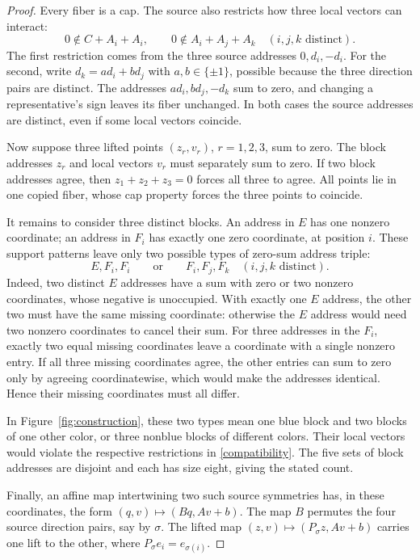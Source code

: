 \documentclass[11pt]{article}
\begin{document}
\begin{proof}
Every fiber is a cap. The source also restricts how three local vectors
can interact:
\begin{equation}\label{compatibility}
 0\notin C+A_i+A_i,\qquad
 0\notin A_i+A_j+A_k\quad(i,j,k\text{ distinct}).
\end{equation}
The first restriction comes from the three source addresses
$0,d_i,-d_i$. For the second, write $d_k=a d_i+b d_j$ with
$a,b\in\{\pm1\}$, possible because the three direction pairs are distinct.
The addresses $a d_i,b d_j,-d_k$ sum to zero, and changing a representative's
sign leaves its fiber unchanged. In both cases the source addresses are
distinct, even if some local vectors coincide.

Now suppose three lifted points $(z_r,v_r)$, $r=1,2,3$, sum to zero.
The block addresses $z_r$ and local vectors $v_r$ must separately sum to zero.
If two block addresses agree, then $z_1+z_2+z_3=0$ forces all three
to agree. All points lie in one copied fiber, whose cap property forces
the three points to coincide.

It remains to consider three distinct blocks. An address in $E$ has
one nonzero coordinate; an address in $F_i$ has exactly one zero
coordinate, at position $i$. These support patterns leave only two
possible types of zero-sum address triple:
\[
 E,F_i,F_i
 \qquad\text{or}\qquad
 F_i,F_j,F_k\quad(i,j,k\text{ distinct}).
\]
Indeed, two distinct $E$ addresses have a sum with zero or two nonzero
coordinates, whose negative is unoccupied. With exactly one $E$ address,
the other two must have the same missing coordinate: otherwise the $E$
address would need two nonzero coordinates to cancel their sum.
For three addresses in the $F_i$, exactly two equal missing coordinates leave a
coordinate with a single nonzero entry. If all three missing coordinates
agree, the other entries can sum to zero only by agreeing coordinatewise,
which would make the addresses identical. Hence their missing coordinates
must all differ.

In Figure~\ref{fig:construction}, these two types mean one blue block and two blocks of one
other color, or three nonblue blocks of different colors. Their local
vectors would violate the respective restrictions in \eqref{compatibility}.
The five sets of block addresses are disjoint and each has size eight,
giving the stated count.

Finally, an affine map intertwining two such source symmetries has, in these
coordinates, the form $(q,v)\mapsto(Bq,Av+b)$. The map $B$ permutes
the four source direction pairs, say by $\sigma$. The lifted map
$(z,v)\mapsto(P_\sigma z,Av+b)$ carries one lift to the other, where
$P_\sigma e_i=e_{\sigma(i)}$.
\end{proof}
\end{document}
